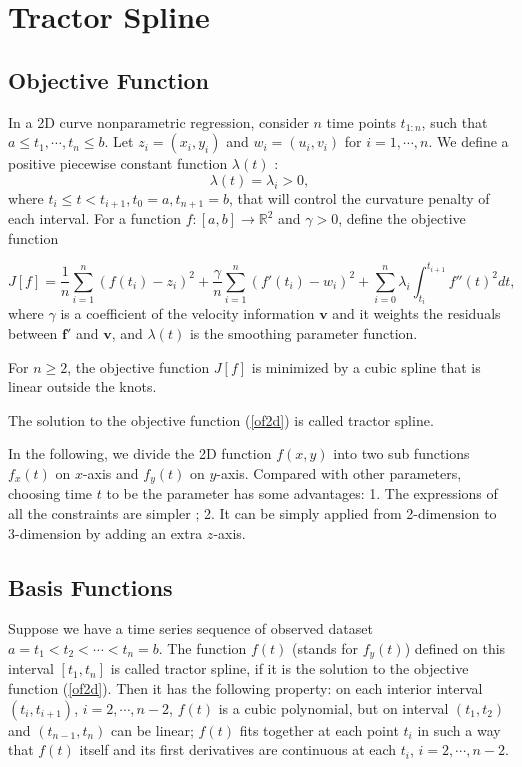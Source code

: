 \section{Tractor Spline}

\subsection{Objective Function}

In a 2D curve nonparametric regression, consider $n$  time points $t_{1:n}$, such that $a \leq t_1, \cdots, t_n \leq b$. Let $z_i=(x_i,y_i)$ and $w_i=(u_i,v_i)$ for $i=1, \cdots, n$. We define a positive piecewise constant function $\lambda(t)$ :
\begin{equation}
\lambda(t) = \lambda_i>0,
\end{equation}
where $t_i \leq t<t_{i+1}, t_0=a, t_{n+1}=b$, that will control the curvature penalty of each interval. For a function $f:[a,b]\longrightarrow \mathbb{R}^2$ and $\gamma>0$, define the objective function 

 \begin{equation}\label{of2d}
J[f]= \frac{1}{n} \sum_{i=1}^{n} (f(t_i)-z_i)^2 + \frac{\gamma}{n} \sum_{i=1}^{n} (f'(t_i)-w_i)^2 +\sum_{i=0}^{n} \lambda_i\int_{t_i}^{t_{i+1}} f''(t)^2 dt,
\end{equation}
where $\gamma$ is a coefficient of the velocity information $\mathbf{v}$ and it weights the residuals between $\mathbf{f}'$ and $\mathbf{v}$, and $\lambda(t)$ is the smoothing parameter function.

\begin{theorem}
For $n\geq2$, the objective function $J[f]$ is minimized by a cubic spline that is linear outside the knots.
\end{theorem}
The solution to the objective function (\ref{of2d}) is called tractor spline.

In the following, we divide the 2D function $f(x,y)$ into two sub functions $f_x(t)$ on $x$-axis and $f_y(t)$ on $y$-axis. Compared with other parameters, choosing time $t$ to be the parameter has some advantages: 1. The expressions of all the constraints are simpler \cite{zhang2013cubic}; 2. It can be simply applied from 2-dimension to 3-dimension by adding an extra $z$-axis.  

\subsection{Basis Functions}
Suppose we have a time series sequence of observed dataset $a=t_1<t_2<\cdots<t_n=b$. The function $f(t)$ (stands for $f_y(t)$) defined on this interval $[t_1,t_n]$ is called tractor spline, if it is the solution to the objective function (\ref{of2d}). Then it has the following property: on each interior interval $(t_i,t_{i+1})$, $i=2,\cdots,n-2$, $f(t)$ is a cubic polynomial, but on interval $(t_1,t_2)$ and $(t_{n-1},t_n)$ can be linear; $f(t)$ fits together at each point $t_i$ in such a way that $f(t)$ itself and its first derivatives are continuous at each $t_i$,  $i=2,\cdots,n-2$. 

